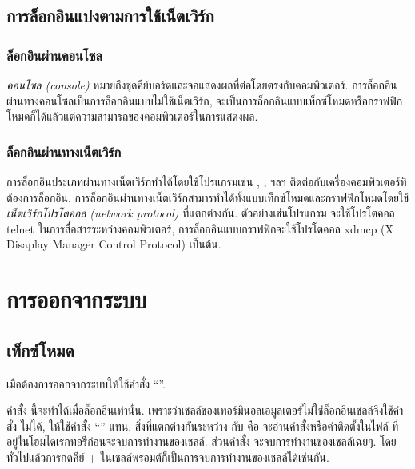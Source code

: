 \begin{thwbr}
\subsection{การล็อกอินแบ่งตามการใช้เน็ตเวิร์ก}
\subsubsection{ล็อกอินผ่านคอนโซล}
\emph{คอนโซล (console)} หมายถึงชุดคีย์บอร์ดและจอแสดงผลที่ต่อโดยตรงกับคอมพิวเตอร์. การล็อกอินผ่านทางคอนโซลเป็นการล็อกอินแบบไม่ใช้เน็ตเวิร์ก, จะเป็นการล็อกอินแบบเท็กซ์โหมดหรือกราฟฟิกโหมดก็ได้แล้วแต่ความสามารถของคอมพิวเตอร์ในการแสดงผล.
\subsubsection{ล็อกอินผ่านทางเน็ตเวิร์ก}
การล็อกอินประเภทผ่านทางเน็ตเวิร์กทำได้โดยใช้โปรแกรมเช่น , ,  ฯลฯ ติดต่อกับเครื่องคอมพิวเตอร์ที่ต้องการล็อกอิน. การล็อกอินผ่านทางเน็ตเวิร์กสามารทำได้ทั้งแบบเท็กซ์โหมดและกราฟฟิกโหมดโดยใช้\emph{เน็ตเวิร์กโปรโตคอล (network protocol)} ที่แตกต่างกัน. ตัวอย่างเช่นโปรแกรม  จะใช้โปรโตคอล telnet ในการสื่อสารระหว่างคอมพิวเตอร์, การล็อกอินแบบกราฟฟิกจะใช้โปรโตคอล xdmcp (X Disaplay Manager Control Protocol) เป็นต้น. 


\section{การออกจากระบบ}
\subsection{เท็กซ์โหมด}
เมื่อต้องการออกจากระบบให้ใช้คำสั่ง ``''.


%
\begin{MyExample}
\end{MyExample}%


คำสั่ง  นี้จะทำได้เมื่อล็อกอินเท่านั้น. เพราะว่าเชลล์ของเทอร์มินอลเอมูลเตอร์ไม่ใช่ล็อกอินเชลล์จึงใช้คำสั่ง  ไม่ได้, ให้ใช้คำสั่ง ``'' แทน.
 สิ่งที่แตกต่างกันระหว่าง  กับ  คือ  จะอ่านคำสั่งหรือค่าติดตั้งในไฟล์  ที่อยู่ในโฮมไดเรกทอรีก่อนจะจบการทำงานของเชลล์. ส่วนคำสั่ง  จะจบการทำงานของเชลล์เฉยๆ. โดยทั่วไปแล้วการกดคีย์ + ในเชลล์พรอมต์ก็เป็นการจบการทำงานของเชลล์ได้เช่นกัน.  




\end{thwbr}
